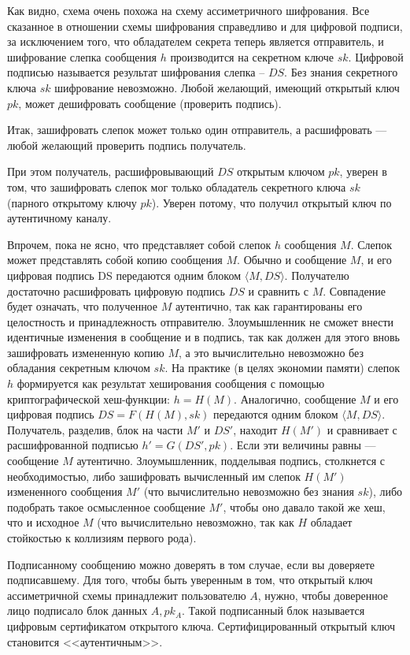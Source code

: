 Как видно, схема очень похожа на схему ассиметричного шифрования. Все сказанное в отношении схемы шифрования справедливо и для цифровой подписи, за исключением того, что обладателем секрета теперь является отправитель, и шифрование слепка сообщения $h$ производится на секретном ключе $sk$. Цифровой подписью называется результат шифрования слепка – $DS$. Без знания секретного ключа $sk$ шифрование невозможно. Любой желающий, имеющий открытый ключ $pk$, может дешифровать сообщение (проверить подпись).

Итак, зашифровать слепок может только один отправитель, а расшифровать --- любой желающий проверить подпись получатель.

При этом получатель, расшифровывающий $DS$ открытым ключом $pk$, уверен в том, что зашифровать слепок мог только обладатель секретного ключа $sk$ (парного открытому ключу $pk$). Уверен потому, что получил открытый ключ по аутентичному каналу.

Впрочем, пока не ясно, что представляет собой слепок $h$ сообщения $M$. Слепок может представлять собой копию сообщения $M$. Обычно и сообщение $M$, и его цифровая подпись DS передаются одним блоком $\langle M,DS\rangle$. Получателю достаточно расшифровать цифровую подпись $DS$ и сравнить с $M$. Совпадение будет означать, что полученное $M$ аутентично, так как гарантированы его целостность и принадлежность отправителю. Злоумышленник не сможет внести идентичные изменения в сообщение и в подпись, так как должен для этого вновь зашифровать измененную копию $M$, а это вычислительно невозможно без обладания секретным ключом $sk$. На практике (в целях экономии памяти) слепок $h$ формируется как результат хеширования сообщения с помощью криптографической хеш-функции: $h=H(M)$. Аналогично, сообщение $M$ и его цифровая подпись $DS=F(H(M), sk)$ передаются одним блоком $\langle M,DS\rangle$. Получатель, разделив, блок на части $M'$ и $DS'$, находит $H(M')$ и сравнивает с расшифрованной подписью $h'=G(DS', pk)$. Если эти величины равны --- сообщение $M$ аутентично. Злоумышленник, подделывая подпись, столкнется с необходимостью, либо зашифровать вычисленный им слепок $H(M')$ измененного сообщения $M'$ (что вычислительно невозможно без знания $sk$), либо подобрать такое осмысленное сообщение $M'$, чтобы оно давало такой же хеш, что и исходное $M$ (что вычислительно невозможно, так как $H$ обладает стойкостью к коллизиям первого рода).

Подписанному сообщению можно доверять в том случае, если вы доверяете подписавшему. Для того, чтобы быть уверенным в том, что открытый ключ ассиметричной схемы принадлежит пользователю $A$, нужно, чтобы доверенное лицо подписало блок данных $A, pk_A$. Такой подписанный блок называется цифровым сертификатом открытого ключа. Сертифицированный открытый ключ становится <<аутентичным>>.

